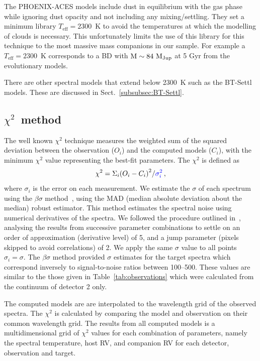 \documentclass[fleqn,usenatbib]{mnras}
\newcommand*\bl{\color{blue}}
\begin{document}
    The PHOENIX-ACES models include dust in equilibrium with the gas phase while ignoring dust opacity and not including any mixing/settling. They set a minimum library \(T_{\textrm{eff}}=2300\)~K to avoid the temperatures at which the modelling of clouds is necessary. This unfortunately limits the use of this library for this technique to the most massive mass companions in our sample. For example a \(T_{\textrm{eff}}=2300\)~K corresponds to a BD with \(\rm M\sim84~M_{Jup}\) at 5 Gyr from the~\citet{baraffe_evolutionary_2003} evolutionary models.
    
    There are other spectral models that extend below 2300~K such as the {BT-Settl} models\citep{allard_btsettl_2013,baraffe_new_2015}. These are discussed in Sect.~\ref{subsubsec:BT-Settl}.
    
    \subsection{\texorpdfstring{\(\chi^{2}\)}\ \ method}
    \label{subsec:chi2}
    The well known \(\chi^{2}\) technique measures the weighted sum of the squared deviation between the observation (\({O}_{i}\)) and the computed models (\(C_{i}\)), with the minimum \(\chi^2\) value representing the best-fit parameters. The \(\chi^{2}\) is defined as
    \begin{equation}
    \chi^{2} = {\Sigma}_i { (O_{i} - C_{i})}^2 / {\bl {\sigma}_{i}^{2}}\,,
    \end{equation}
    where \({\sigma}_{i}\) is the error on each measurement. We estimate the \(\sigma\) of each spectrum using the \(\beta\sigma\) method~\citep{czesla_posteriori_2018}, using the MAD (median absolute deviation about the median) robust estimator. {This method estimates the spectral noise using numerical derivatives of the spectra. We followed the procedure outlined in~\citet{czesla_posteriori_2018}, analysing the results from successive parameter combinations to settle on an order of approximation (derivative level) of 5, and a jump parameter (pixels skipped to avoid correlations) of 2.} We apply the same \(\sigma\) value to all points \({\sigma}_{i} = \sigma\). The \(\beta\sigma\) method provided \(\sigma\) estimates for the target spectra which correspond inversely to signal-to-noise ratios between 100--500. These values are similar to the those given in Table~\ref{tab:observations} which were calculated from the continuum of detector 2 only.
    
    The computed models are are interpolated to the wavelength grid of the observed spectra. The \(\chi^{2}\) is calculated by comparing the model and observation on their common wavelength grid. The results from all computed models is a multidimensional grid of \(\chi^2\) values for each combination of parameters, namely the spectral temperature, host RV, and companion RV for each detector, observation and target.
    
\end{document}
